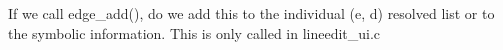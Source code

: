 
If we call edge_add(), do we add this to the individual (e, d)
resolved list or to the symbolic information.  This is only called in
lineedit_ui.c

